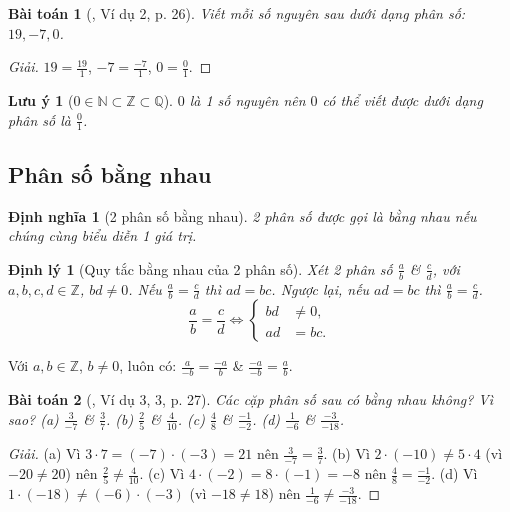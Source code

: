 \documentclass{article}
\newtheorem{baitoan}{Bài toán}
\newtheorem{dinhly}{Định lý}
\newtheorem{dinhnghia}{Định nghĩa}
\newtheorem{luuy}{Lưu ý}
\begin{document}
\begin{baitoan}[\cite{SGK_Toan_6_Canh_Dieu_tap_2}, Ví dụ 2, p. 26]
	Viết mỗi số nguyên sau dưới dạng phân số: $19,-7,0$.
\end{baitoan}

\begin{proof}[Giải]
	$19 = \frac{19}{1}$, $-7 = \frac{-7}{1}$, $0 = \frac{0}{1}$.
\end{proof}

\begin{luuy}[$0\in\mathbb{N}\subset\mathbb{Z}\subset\mathbb{Q}$]
	$0$ là 1 số nguyên nên $0$ có thể viết được dưới dạng phân số là $\frac{0}{1}$.
\end{luuy}

\subsection{Phân số bằng nhau}

\begin{dinhnghia}[2 phân số bằng nhau]
	2 phân số được gọi là \emph{bằng nhau} nếu chúng cùng biểu diễn 1 giá trị.
\end{dinhnghia}

\begin{dinhly}[Quy tắc bằng nhau của 2 phân số]
	Xét 2 phân số $\frac{a}{b}$ \& $\frac{c}{d}$, với $a,b,c,d\in\mathbb{Z}$, $bd\ne0$. Nếu $\frac{a}{b} = \frac{c}{d}$ thì $ad = bc$. Ngược lại, nếu $ad = bc$ thì $\frac{a}{b} = \frac{c}{d}$.
	\begin{equation*}
		\boxed{\frac{a}{b} = \frac{c}{d}\Leftrightarrow\left\{\begin{split}
			bd&\ne0,\\
			ad &= bc.
		\end{split}\right.}
	\end{equation*}
\end{dinhly}
Với $a,b\in\mathbb{Z}$, $b\ne0$, luôn có: $\frac{a}{-b} = \frac{-a}{b}$ \& $\frac{-a}{-b} = \frac{a}{b}$.

\begin{baitoan}[\cite{SGK_Toan_6_Canh_Dieu_tap_2}, Ví dụ 3, 3, p. 27]
	Các cặp phân số sau có bằng nhau không? Vì sao? (a) $\frac{3}{-7}$ \& $\frac{3}{7}$. (b) $\frac{2}{5}$ \& $\frac{4}{10}$. (c) $\frac{4}{8}$ \& $\frac{-1}{-2}$. (d) $\frac{1}{-6}$ \& $\frac{-3}{-18}$.
\end{baitoan}

\begin{proof}[Giải]
	(a) Vì $3\cdot7 = (-7)\cdot(-3) = 21$ nên $\frac{3}{-7} = \frac{3}{7}$. (b) Vì $2\cdot(-10)\ne5\cdot4$ (vì $-20\ne20$) nên $\frac{2}{5}\ne\frac{4}{10}$. (c) Vì $4\cdot(-2) = 8\cdot(-1) = -8$ nên $\frac{4}{8} = \frac{-1}{-2}$. (d) Vì $1\cdot(-18)\ne(-6)\cdot(-3)$ (vì $-18\ne18$) nên $\frac{1}{-6}\ne\frac{-3}{-18}$.
\end{proof}
\end{document}

